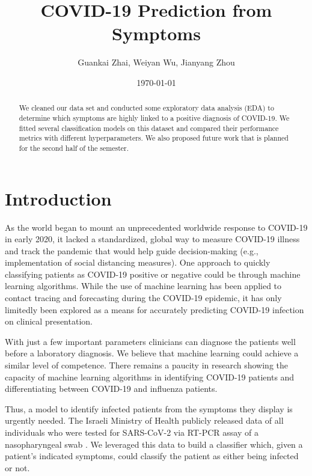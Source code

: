 \documentclass[a4paper, 11pt]{article}
\title{\vspace{-1cm}COVID-19 Prediction from Symptoms}
\author{Guankai Zhai, Weiyan Wu, Jianyang Zhou}
\date{\today} %
\begin{document}
\maketitle

\begin{abstract}
We cleaned our data set and conducted some exploratory data analysis (EDA) to determine which symptoms are highly linked to a positive diagnosis of COVID-19. We fitted several classification models on this dataset and compared their performance metrics with different hyperparameters. We also proposed future work that is planned for the second half of the semester. 
\end{abstract}
\section*{Introduction}
As the world began to mount an unprecedented worldwide response to COVID-19 in early 2020, it lacked a standardized, global way to measure COVID-19 illness and track the pandemic that would help guide decision-making (e.g., implementation of social distancing measures). One approach to quickly classifying patients as COVID-19 positive or negative could be through machine learning algorithms. While the use of machine learning has been applied to contact tracing and forecasting during the COVID-19 epidemic, it has only limitedly been explored as a means for accurately predicting COVID-19 infection on clinical presentation. \par 

With just a few important parameters clinicians can diagnose the patients well before a laboratory diagnosis. We believe that machine learning could achieve a similar level of competence. There remains a paucity in research showing the capacity of machine learning algorithms in identifying COVID-19 patients and differentiating between COVID-19 and influenza patients. \par

Thus, a model to identify infected patients from the symptoms they display is urgently needed. The Israeli Ministry of Health publicly released data of all individuals who were tested for SARS-CoV-2 via RT-PCR assay of a nasopharyngeal swab \cite{data}. We leveraged this data to build a classifier which, given a patient's indicated symptoms, could classify the patient as either being infected or not.
\end{document}

